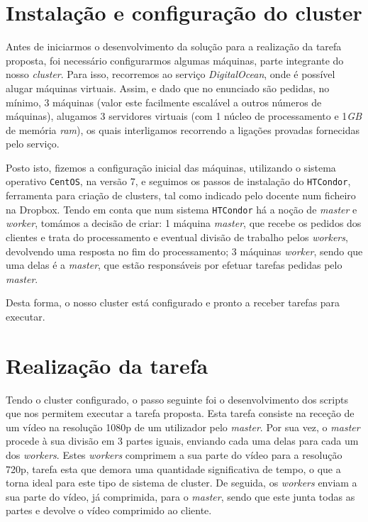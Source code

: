 \documentclass[a4paper]{report}
\begin{document}
    \section{Instalação e configuração do cluster}
	Antes de iniciarmos o desenvolvimento da solução para a realização da tarefa proposta, foi necessário configurarmos algumas máquinas, parte integrante do nosso \textit{cluster}. Para isso, recorremos ao serviço \textit{DigitalOcean}, onde é possível alugar máquinas virtuais. Assim, e dado que no enunciado são pedidas, no mínimo, 3 máquinas (valor este facilmente escalável a outros números de máquinas), alugamos 3 servidores virtuais (com 1 núcleo de processamento e 1\textit{GB} de memória \textit{ram}), os quais interligamos recorrendo a ligações provadas fornecidas pelo serviço.
	
	Posto isto, fizemos a configuração inicial das máquinas, utilizando o sistema operativo \texttt{CentOS}, na versão 7, e seguimos os passos de instalação do \texttt{HTCondor}, ferramenta para criação de clusters, tal como indicado pelo docente num ficheiro na Dropbox.
	Tendo em conta que num sistema \texttt{HTCondor} há a noção de \textit{master} e \textit{worker}, tomámos a decisão de criar: 1 máquina \textit{master}, que recebe os pedidos dos clientes e trata do processamento e eventual divisão de trabalho pelos \textit{workers}, devolvendo uma resposta no fim do processamento; 3 máquinas \textit{worker}, sendo que uma delas é a \textit{master}, que estão responsáveis por efetuar tarefas pedidas pelo \textit{master}.
	
	Desta forma, o nosso cluster está configurado e pronto a receber tarefas para executar.
    
    \section{Realização da tarefa}
    Tendo o cluster configurado, o passo seguinte foi o desenvolvimento dos scripts que nos permitem executar a tarefa proposta. Esta tarefa consiste na receção de um vídeo na resolução 1080p de um utilizador pelo \textit{master}. Por sua vez, o \textit{master} procede à sua divisão em 3 partes iguais, enviando cada uma delas para cada um dos \textit{workers}. Estes \textit{workers} comprimem a sua parte do vídeo para a resolução 720p, tarefa esta que demora uma quantidade significativa de tempo, o que a torna ideal para este tipo de sistema de cluster. De seguida, os \textit{workers} enviam a sua parte do vídeo, já comprimida, para o \textit{master}, sendo que este junta todas as partes e devolve o vídeo comprimido ao cliente.
    
\end{document}
